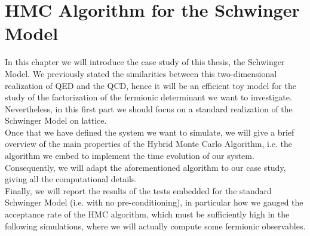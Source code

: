 \chapter{HMC Algorithm for the Schwinger Model}
\label{chap: HMC}

In this chapter we will introduce the case study of this thesis, the Schwinger Model. We previously stated the similarities between this two-dimensional realization of QED and the QCD, hence it will be an efficient toy model for the study of the factorization of the fermionic determinant we want to investigate. Nevertheless, in this first part we should focus on a standard realization of the Schwinger Model on lattice.
\\ Once that we have defined the system we want to simulate, we will give a brief overview of the main properties of the Hybrid Monte Carlo Algorithm, i.e. the algorithm we embed to implement the time evolution of our system. 
\\ Consequently, we will adapt the aforementioned algorithm to our case study, giving all the computational details.
\\ Finally, we will report the results of the tests embedded for the standard Schwinger Model (i.e. with no pre-conditioning), in particular how we gauged the acceptance rate of the HMC algorithm, which must be sufficiently high in the following simulations, where we will actually compute some fermionic observables. 

